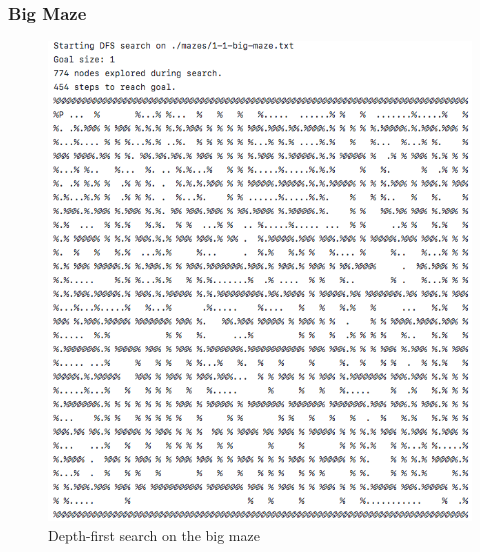 \documentclass[titlepage]{article}
\begin{document}
\newpage
\subsubsection{Big Maze}
\begin{figure}[h!]
\includegraphics[width=\linewidth]{dfsbig.png}
\caption{Depth-first search on the big maze}
\label{fig:DFSbig}
\end{figure}

\newpage
\end{document}
